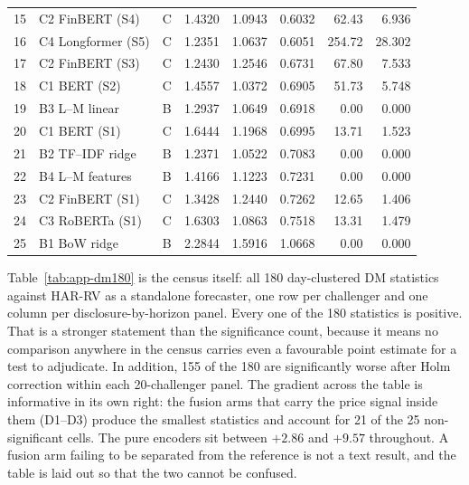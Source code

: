 \begin{table}[htbp]
\begin{tabular}{@{}rllrrrrr@{}}
15 & C2 FinBERT (S4)     & C & 1.4320 & 1.0943 & 0.6032 & 62.43  & 6.936 \\
16 & C4 Longformer (S5)  & C & 1.2351 & 1.0637 & 0.6051 & 254.72 & 28.302 \\
17 & C2 FinBERT (S3)     & C & 1.2430 & 1.2546 & 0.6731 & 67.80  & 7.533 \\
18 & C1 BERT (S2)        & C & 1.4557 & 1.0372 & 0.6905 & 51.73  & 5.748 \\
19 & B3 L--M linear      & B & 1.2937 & 1.0649 & 0.6918 & 0.00   & 0.000 \\
20 & C1 BERT (S1)        & C & 1.6444 & 1.1968 & 0.6995 & 13.71  & 1.523 \\
21 & B2 TF--IDF ridge    & B & 1.2371 & 1.0522 & 0.7083 & 0.00   & 0.000 \\
22 & B4 L--M features    & B & 1.4166 & 1.1223 & 0.7231 & 0.00   & 0.000 \\
23 & C2 FinBERT (S1)     & C & 1.3428 & 1.2440 & 0.7262 & 12.65  & 1.406 \\
24 & C3 RoBERTa (S1)     & C & 1.6303 & 1.0863 & 0.7518 & 13.31  & 1.479 \\
25 & B1 BoW ridge        & B & 2.2844 & 1.5916 & 1.0668 & 0.00   & 0.000 \\
\bottomrule
\end{tabular}
\end{table}

Table~\ref{tab:app-dm180} is the census itself: all 180 day-clustered DM
statistics against HAR-RV as a standalone forecaster, one row per
challenger and one column per disclosure-by-horizon panel. Every one of
the 180 statistics is positive. That is a stronger statement than the
significance count, because it means no comparison anywhere in the
census carries even a favourable point estimate for a test to
adjudicate. In addition, 155 of the 180 are significantly worse after
Holm correction within each 20-challenger panel. The gradient across the
table is informative in its own right: the fusion arms that carry the
price signal inside them (D1--D3) produce the smallest statistics and
account for 21 of the 25 non-significant cells. The pure
encoders sit between $+2.86$ and $+9.57$ throughout. A fusion arm
failing to be separated from the reference is not a text result, and the
table is laid out so that the two cannot be confused.


